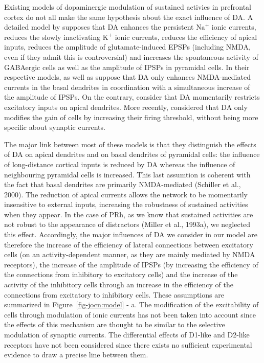 \documentclass[
  11pt,
  a4paper,
]{scrbook}
\begin{document}
Existing models of dopaminergic modulation of sustained activies in
prefrontal cortex do not all make the same hypothesis about the exact
influence of DA. A detailed model by supposes that DA enhances the
persistent \(\text{Na}^{+}\) ionic currents, reduces the slowly
inactivating \(\text{K}^{+}\) ionic currents, reduces the efficiency of
apical inputs, reduces the amplitude of glutamate-induced EPSPs
(including NMDA, even if they admit this is controversial) and increases
the spontaneous activity of GABAergic cells as well as the amplitude of
IPSPs in pyramidal cells. In their respective models, as well as suppose
that DA only enhances NMDA-mediated currents in the basal dendrites in
coordination with a simultaneous increase of the amplitude of IPSPs. On
the contrary, consider that DA momentarily restricts excitatory inputs
on apical dendrites. More recently, considered that DA only modifies the
gain of cells by increasing their firing threshold, without being more
specific about synaptic currents.

The major link between most of these models is that they distinguish the
effects of DA on apical dendrites and on basal dendrites of pyramidal
cells: the influence of long-distance cortical inputs is reduced by DA
whereas the influence of neighbouring pyramidal cells is increased. This
last assumtion is coherent with the fact that basal dendrites are
primarily NMDA-mediated (Schiller et al., 2000). The reduction of apical
currents allows the network to be momentarily insensitive to external
inputs, increasing the robustness of sustained activities when they
appear. In the case of PRh, as we know that sustained activities are not
robust to the appearance of distractors (Miller et al., 1993a), we
neglected this effect. Accordingly, the major influences of DA we
consider in our model are therefore the increase of the efficiency of
lateral connections between excitatory cells (on an activity-dependent
manner, as they are mainly mediated by NMDA receptors), the increase of
the amplitude of IPSPs (by increasing the efficiency of the connections
from inhibitory to excitatory cells) and the increase of the activity of
the inhibitory cells through an increase in the efficiency of the
connections from excitatory to inhibitory cells. These assumptions are
summarized in Figure~\ref{fig-jocn:model} - a. The modification of the
excitability of cells through modulation of ionic currents has not been
taken into account since the effects of this mechanism are thought to be
similar to the selective modulation of synaptic currents. The
differential effects of D1-like and D2-like receptors have not been
considered since there exists no sufficient experimental evidence to
draw a precise line between them.
\end{document}
